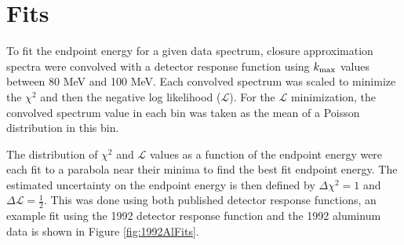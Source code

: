 
\section { Fits }

To fit the endpoint energy for a given data spectrum, closure approximation spectra were convolved with a detector
response function using $\mbox{$k_{\rm max}$}$ values between 80 MeV and 100 MeV.
Each convolved spectrum was scaled to minimize the $\chi^2$ and then the negative log likelihood ($\mathcal{L}$).
For the $\mathcal{L}$ minimization, the convolved spectrum value in each bin was taken as the mean 
of a Poisson distribution in this bin.



The distribution of $\chi^2$ and $\mathcal{L}$ values as a function of the endpoint energy were each fit to a parabola near 
their minima to find the best fit endpoint energy. The estimated uncertainty on the endpoint energy is then
defined by $\Delta \chi^2 = 1$ and $\Delta \mathcal{L} = \frac{1}{2}$. This was done using both published detector response
functions, an example fit using the 1992 detector response function
and the 1992 aluminum data is shown in Figure \ref{fig:1992AlFits}. 

